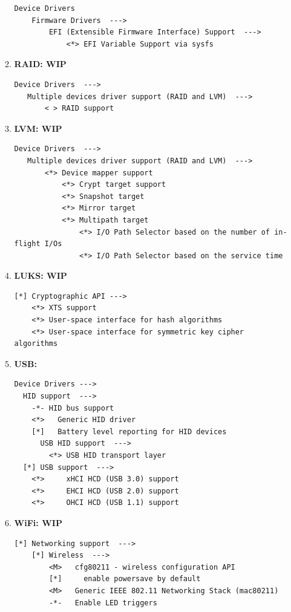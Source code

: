 \documentclass[10pt, a4paper, onecolumn, oneside, titlepage, openany]{book}
\begin{document}
\begin{enumerate}
\begin{enumerate}
\begin{Verbatim}[commandchars=\\\{\}]
Device Drivers
    Firmware Drivers  --->
        EFI (Extensible Firmware Interface) Support  --->
            <*> EFI Variable Support via sysfs
\end{Verbatim}
        \item \textbf{RAID: WIP}
\begin{Verbatim}[commandchars=\\\{\}]
Device Drivers  --->
   Multiple devices driver support (RAID and LVM)  --->
       < > RAID support
\end{Verbatim}
        \item \textbf{LVM: WIP}
\begin{Verbatim}[commandchars=\\\{\}]
Device Drivers  --->
   Multiple devices driver support (RAID and LVM)  --->
       <*> Device mapper support
           <*> Crypt target support
           <*> Snapshot target
           <*> Mirror target
           <*> Multipath target
               <*> I/O Path Selector based on the number of in-flight I/Os
               <*> I/O Path Selector based on the service time
\end{Verbatim}
        \item \textbf{LUKS: WIP}
\begin{Verbatim}[commandchars=\\\{\}]
[*] Cryptographic API --->
    <*> XTS support
    <*> User-space interface for hash algorithms
    <*> User-space interface for symmetric key cipher algorithms
\end{Verbatim}
        \item \textbf{USB:}
\begin{Verbatim}[commandchars=\\\{\}]
Device Drivers --->
  HID support  --->
    -*- HID bus support
    <*>   Generic HID driver
    [*]   Battery level reporting for HID devices
      USB HID support  --->
        <*> USB HID transport layer
  [*] USB support  --->
    <*>     xHCI HCD (USB 3.0) support
    <*>     EHCI HCD (USB 2.0) support
    <*>     OHCI HCD (USB 1.1) support
\end{Verbatim}
        \item \textbf{WiFi: WIP}
\begin{Verbatim}[commandchars=\\\{\}]
[*] Networking support  --->
    [*] Wireless  --->
        <M>   cfg80211 - wireless configuration API
        [*]     enable powersave by default
        <M>   Generic IEEE 802.11 Networking Stack (mac80211)
        -*-   Enable LED triggers


\end{Verbatim}
\end{enumerate}
\end{enumerate}
\end{document}
